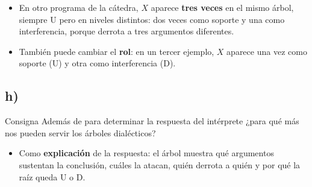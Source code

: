\documentclass[11pt,a4paper]{article}
\begin{document}
\begin{center}
\begin{minipage}{\linewidth}
\centering
{}
\end{minipage}
\end{center}

\begin{extras}
\begin{itemize}
  \item En otro programa de la cátedra, $X$ aparece \textbf{tres veces} en el mismo árbol, siempre U pero en niveles distintos: dos veces como soporte y una como interferencia, porque derrota a tres argumentos diferentes.
  \item También puede cambiar el \textbf{rol}: en un tercer ejemplo, $X$ aparece una vez como soporte (U) y otra como interferencia (D).
\end{itemize}
\end{extras}

\subsection{h)}

\begin{enunciado}{Consigna}
Además de para determinar la respuesta del intérprete ¿para qué más nos pueden servir los árboles dialécticos?
\end{enunciado}

\begin{itemize}
  \item Como \textbf{explicación} de la respuesta: el árbol muestra qué argumentos sustentan la conclusión, cuáles la atacan, quién derrota a quién y por qué la raíz queda U o D.
\end{itemize}
\end{document}
